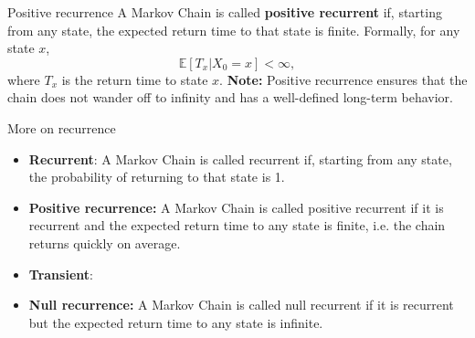 \begin{frame}{Positive recurrence}
    A Markov Chain is called \textbf{positive recurrent} if, starting from any state, the expected return time to that state is finite. Formally, for any state $x$,
    \begin{equation*}
        \mathbb{E}[T_x | X_0 = x] < \infty,
    \end{equation*}
    where $T_x$ is the return time to state $x$.
    \textbf{Note:} Positive recurrence ensures that the chain does not wander off to infinity and has a well-defined long-term behavior.
\end{frame}

\begin{frame}{More on recurrence}
    \begin{itemize}
        \item \textbf{Recurrent}: A Markov Chain is called recurrent if, starting from any state, the probability of returning to that state is 1.
        \item \textbf{Positive recurrence:} A Markov Chain is called positive recurrent if it is recurrent and the expected return time to any state is finite, i.e. the chain returns quickly on average.
        \item \textbf{Transient}:
        \item \textbf{Null recurrence:} A Markov Chain is called null recurrent if it is recurrent but the expected return time to any state is infinite.
    \end{itemize}
\end{frame}
